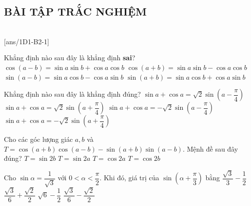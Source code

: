 \subsection{BÀI TẬP TRẮC NGHIỆM}

 \\
\setcounter{ex}{0}
[ans/1D1-B2-1]
\begin{ex}%
	Khẳng định nào sau đây là khẳng định \textbf{sai}?
	\choice
	{$\cos \left({a-b}\right)=\sin a\sin b+\cos a\cos b$}
	{\True $\cos \left({a+b}\right)=\sin a\sin b-\cos a\cos b$}
	{$\sin \left({a-b}\right)=\sin a\cos b-\cos a\sin b$}
	{$\sin \left({a+b}\right)=\sin a\cos b+\cos a\sin b$}
\end{ex}

\begin{ex}%
	Khẳng định nào sau đây là khẳng định đúng?
	\choice
	{$\sin a+\cos a=\sqrt{2}\sin \left({a-\dfrac{\pi}{4}}\right)$}
	{\True $\sin a+\cos a=\sqrt{2}\sin \left({a+\dfrac{\pi}{4}}\right)$}
	{$\sin a+\cos a=-\sqrt{2}\sin \left({a-\dfrac{\pi}{4}}\right)$}
	{$\sin a+\cos a=-\sqrt{2}\sin \left({a+\dfrac{\pi}{4}}\right)$}
	\loigiai{  } 
\end{ex}

\begin{ex}%
	Cho các góc lượng giác $a,b$ và $T=\cos (a+b)\cos (a-b)-\sin (a+b)\sin (a-b)$. Mệnh đề sau đây đúng?
	\choice
	{$T=\sin 2b$}
	{$T=\sin 2a$}
	{\True $T=\cos 2a$}
	{$T=\cos 2b$}
\end{ex}

\begin{ex}%
	Cho $\sin \alpha=\dfrac{1}{\sqrt{3}}$ với $0<\alpha<\dfrac{\pi}{2}$. Khi đó, giá trị của $\sin \left(\alpha+\dfrac{\pi}{3}\right)$ bằng
	\choice
	{$\dfrac{\sqrt{3}}{3}-\dfrac{1}{2}$}
	{\True $\dfrac{\sqrt{3}}{6}+\dfrac{\sqrt{2}}{2}$}
	{$\sqrt{6}-\dfrac{1}{2}$}
	{$\dfrac{\sqrt{3}}{6}-\dfrac{\sqrt{2}}{2}$}
\end{ex}


